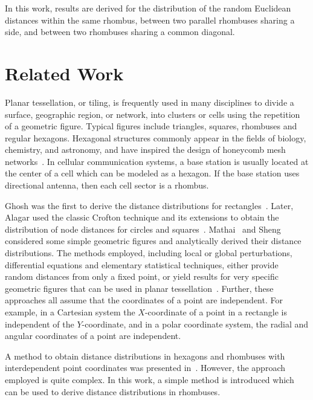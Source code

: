 \documentclass[12pt,draftclsnofoot,onecolumn]{IEEEtran}
\begin{document}
In this work, results are derived for the distribution of
the random Euclidean distances within the same rhombus, between two parallel rhombuses
sharing a side, and between two rhombuses sharing a common diagonal.

\section{Related Work}

Planar tessellation, or tiling, is frequently used in many disciplines to divide
a surface, geographic region, or network, into clusters or cells using the repetition of a geometric figure.
Typical figures include triangles, squares, rhombuses and regular hexagons.
Hexagonal structures commonly appear in the fields of biology, chemistry, and astronomy, and
have inspired the design of honeycomb mesh networks~\cite{stojmenovic1997honeycomb}.
In cellular communication systems, a base station is usually located at the center of a cell which can be modeled as a hexagon.
If the base station uses directional antenna, then each cell sector is a rhombus.

Ghosh was the first to derive the distance distributions for rectangles~\cite{ghosh1943distribution,ghosh1943random}.
Later, Alagar used the classic Crofton technique and its extensions to obtain the distribution of node distances
for circles and squares~\cite{alagar1976distribution}.
Mathai~\cite{mathai1998random,mathai1999random} and Sheng~\cite{sheng1985distance}
considered some simple geometric figures and analytically derived their distance distributions.
The methods employed, including local or global perturbations, differential equations and elementary statistical techniques,
either provide random distances from only a fixed point,
or yield results for very specific geometric figures that can be used in
planar tessellation~\cite{mathai1999introduction}.
Further, these approaches all assume that the coordinates of a point are independent.
For example, in a Cartesian system the $X$-coordinate of a point in a rectangle
is independent of the $Y$-coordinate, and in a polar coordinate
system, the radial and angular coordinates of a point are independent.

A method to obtain distance distributions in hexagons and rhombuses with interdependent point coordinates was
presented in~\cite{zhuang2011random,zhuang2012geometrical}.
However, the approach employed is quite complex.
In this work, a simple method is introduced which can be used to derive distance distributions in rhombuses.
\end{document}
